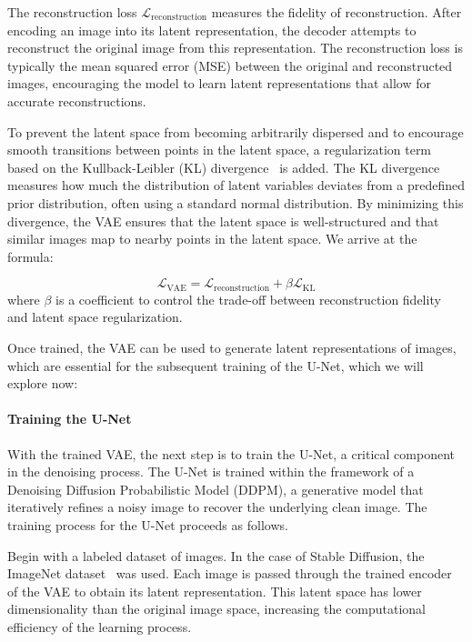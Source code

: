 \documentclass[11pt]{article}
\begin{document}
The reconstruction loss $\mathcal{L}_{\mathrm{reconstruction}}$ measures the fidelity of reconstruction. After encoding an image into its latent representation, the decoder attempts to reconstruct the original image from this representation. The reconstruction loss is typically the mean squared error (MSE) between the original and reconstructed images, encouraging the model to learn latent representations that allow for accurate reconstructions.

To prevent the latent space from becoming arbitrarily dispersed and to encourage smooth transitions between points in the latent space, a regularization term based on the Kullback-Leibler (KL) divergence~\cite{kullback1951OnInformationandSufficiency} is added. The KL divergence measures how much the distribution of latent variables deviates from a predefined prior distribution, often using a standard normal distribution. By minimizing this divergence, the VAE ensures that the latent space is well-structured and that similar images map to nearby points in the latent space. We arrive at the formula:

$$\mathcal{L}_{\mathrm{VAE}} = \mathcal{L}_{\mathrm{reconstruction}} + \beta \mathcal{L}_{\mathrm{KL}}$$
where $\beta$ is a coefficient to control the trade-off between reconstruction fidelity and latent space regularization.

Once trained, the VAE can be used to generate latent representations of images, which are essential for the subsequent training of the U-Net, which we will explore now:

\paragraph{Training the U-Net}
With the trained VAE, the next step is to train the U-Net, a critical component in the denoising process. The U-Net is trained within the framework of a Denoising Diffusion Probabilistic Model (DDPM)\cite{ho2020denoisingdiffusionprobabilisticmodels}, a generative model that iteratively refines a noisy image to recover the underlying clean image. The training process for the U-Net proceeds as follows.

Begin with a labeled dataset of images. In the case of Stable Diffusion, the ImageNet dataset~\cite{deng2009imagenet} was used. Each image is passed through the trained encoder of the VAE to obtain its latent representation. This latent space has lower dimensionality than the original image space, increasing the computational efficiency of the learning process.
\end{document}
